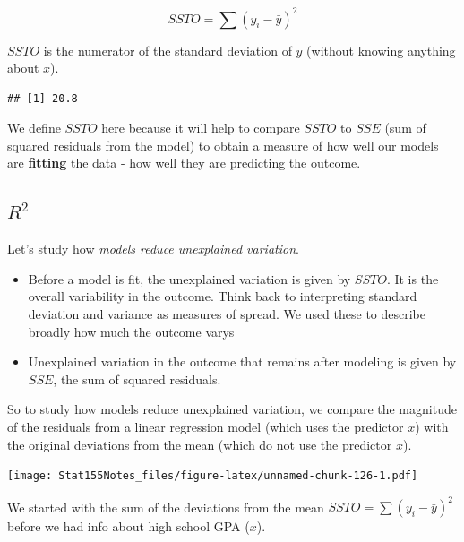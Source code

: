 \documentclass[]{book}
\newenvironment{Shaded}{\begin{snugshade}}{\end{snugshade}}
\newcommand{\DataTypeTok}[1]{\textcolor[rgb]{0.13,0.29,0.53}{#1}}
\newcommand{\DecValTok}[1]{\textcolor[rgb]{0.00,0.00,0.81}{#1}}
\newcommand{\KeywordTok}[1]{\textcolor[rgb]{0.13,0.29,0.53}{\textbf{#1}}}
\newcommand{\NormalTok}[1]{#1}
\newcommand{\OperatorTok}[1]{\textcolor[rgb]{0.81,0.36,0.00}{\textbf{#1}}}
\newcommand{\StringTok}[1]{\textcolor[rgb]{0.31,0.60,0.02}{#1}}
\providecommand{\tightlist}{%
  \setlength{\itemsep}{0pt}\setlength{\parskip}{0pt}}
\begin{document}
\[ SSTO = \sum{(y_i -\bar{y})^2} \]

\(SSTO\) is the numerator of the standard deviation of \(y\) (without knowing anything about \(x\)).

\begin{Shaded}
\end{Shaded}

\begin{verbatim}
## [1] 20.8
\end{verbatim}

We define \(SSTO\) here because it will help to compare \(SSTO\) to \(SSE\) (sum of squared residuals from the model) to obtain a measure of how well our models are \textbf{fitting} the data - how well they are predicting the outcome.

\hypertarget{r2}{%
\subsection{\texorpdfstring{\(R^2\)}{R\^{}2}}\label{r2}}

Let's study how \emph{models reduce unexplained variation}.

\begin{itemize}
\tightlist
\item
  Before a model is fit, the unexplained variation is given by \(SSTO\). It is the overall variability in the outcome. Think back to interpreting standard deviation and variance as measures of spread. We used these to describe broadly how much the outcome varys
\item
  Unexplained variation in the outcome that remains after modeling is given by \(SSE\), the sum of squared residuals.
\end{itemize}

So to study how models reduce unexplained variation, we compare the magnitude of the residuals from a linear regression model (which uses the predictor \(x\)) with the original deviations from the mean (which do not use the predictor \(x\)).

\texttt{[image: Stat155Notes\_files/figure-latex/unnamed-chunk-126-1.pdf]}

We started with the sum of the deviations from the mean \(SSTO = \sum{(y_i - \bar{y})^2}\) before we had info about high school GPA (\(x\)).
\end{document}
